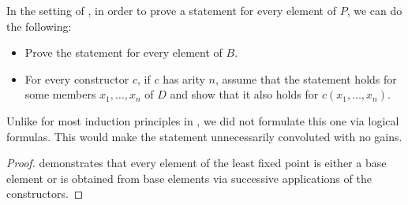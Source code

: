 \begin{theorem}\label{thm:least_fixed_point_induction}\mimprovised
  In the setting of , in order to prove a statement for every element of \( P \), we can do the following:
  \begin{itemize}
    \item Prove the statement for every element of \( B \).
    \item For every constructor \( c \), if \( c \) has arity \( n \), assume that the statement holds for some members \( x_1, \ldots, x_n \) of \( D \) and show that it also holds for \( c(x_1, \ldots, x_n) \).
  \end{itemize}
\end{theorem}
\begin{comments}
  \item Unlike for most induction principles in , we did not formulate this one via logical formulas. This would make the statement unnecessarily convoluted with no gains.
\end{comments}
\begin{proof}
   demonstrates that every element of the least fixed point is either a base element or is obtained from base elements via successive applications of the constructors.
\end{proof}

